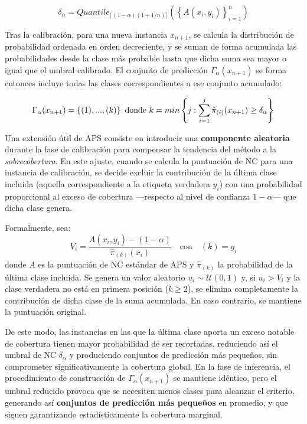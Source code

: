 $$
\delta_\alpha = Quantile_{ \lceil  (1-\alpha) (1 + 1/n)  \rceil } ( \left\{ A(x_i,y_i) \right\}_{i=1}^n )
$$

Tras la calibración, para una nueva instancia $x_{n+1}$, se calcula la distribución de probabilidad ordenada en orden decreciente, y se suman de forma acumulada las probabilidades desde la clase más probable hasta que dicha suma sea mayor o igual que el umbral calibrado. El conjunto de predicción $\Gamma_\alpha(x_{n+1})$ se forma entonces incluye todas las clases correspondientes a ese conjunto acumulado: 

$$
\Gamma_\alpha(x_{n+1}) = \left\{ (1),...,(k) \right\} \\ \textnormal{ donde } 
k = min\left\{ j: \sum_{i=1}^{j} \hat{\pi}_{(i)}(x_{n+1}) \ge \delta_\alpha \right\} 
$$

Una extensión útil de \acrshort{APS} consiste en introducir una \textbf{componente aleatoria} durante la fase de calibración para compensar la tendencia del método a la \textit{sobrecobertura}. En este ajuste, cuando se calcula la puntuación de \acrshort{NC} para una instancia de calibración, se decide excluir la contribución de la última clase incluida (aquella correspondiente a la etiqueta verdadera $y_i$) con una probabilidad proporcional al exceso de cobertura ---respecto al nivel de confianza $1-\alpha$--- que dicha clase genera.

Formalmente, sea:
$$
V_i = \frac{A(x_i, y_i) - (1-\alpha)}{\hat{\pi}_{(k)}(x_i)} \quad \text{con} \quad (k) = y_i
$$
donde $A$ es la puntuación de \acrshort{NC} estándar de \acrshort{APS} y $\hat{\pi}_{(k)}$ la probabilidad de la última clase incluida. Se genera un valor aleatorio $u_i \sim \mathcal{U}(0,1)$ y, si $u_i > V_i$ y la clase verdadera no está en primera posición ($k \ge 2$), se elimina completamente la contribución de dicha clase de la suma acumulada. En caso contrario, se mantiene la puntuación original.

De este modo, las instancias en las que la última clase aporta un exceso notable de cobertura tienen mayor probabilidad de ser recortadas, reduciendo así el umbral de \acrshort{NC} $\delta_\alpha$ y produciendo conjuntos de predicción más pequeños, sin comprometer significativamente la cobertura global. En la fase de inferencia, el procedimiento de construcción de $\Gamma_\alpha(x_{n+1})$ se mantiene idéntico, pero el umbral reducido provoca que se necesiten menos clases para alcanzar el criterio, generando así \textbf{conjuntos de predicción más pequeños} en promedio, y que siguen garantizando estadísticamente la cobertura marginal.

